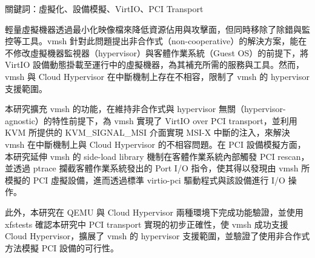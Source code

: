 \begin{ZhAbstract}
    \begin{ZhAbstractItems}
        \noindent \text 關鍵詞：虛擬化、設備模擬、VirtIO、PCI Transport

    \end{ZhAbstractItems}

    \begin{ZhAbstractDescription}
        輕量虛擬機器透過最小化映像檔來降低資源佔用與攻擊面，但同時移除了除錯與監控等工具。vmsh 針對此問題提出非合作式（non-cooperative）的解決方案，能在不修改虛擬機器監視器（hypervisor）與客體作業系統（Guest OS）的前提下，將 VirtIO 設備動態掛載至運行中的虛擬機器，為其補充所需的服務與工具。然而，vmsh 與 Cloud Hypervisor 在中斷機制上存在不相容，限制了 vmsh 的 hypervisor 支援範圍。

        本研究擴充 vmsh 的功能，在維持非合作式與 hypervisor 無關（hypervisor-agnostic）的特性前提下，為 vmsh 實現了 VirtIO over PCI transport，並利用 KVM 所提供的 KVM\_SIGNAL\_MSI 介面實現 MSI-X 中斷的注入，來解決 vmsh 在中斷機制上與 Cloud Hypervisor 的不相容問題。在 PCI 設備模擬方面，本研究延伸 vmsh 的 side-load library 機制在客體作業系統內部觸發 PCI rescan，並透過 ptrace 攔截客體作業系統發出的 Port I/O 指令，使其得以發現由 vmsh 所模擬的 PCI 虛擬設備，進而透過標準 virtio-pci 驅動程式與該設備進行 I/O 操作。

        此外，本研究在 QEMU 與 Cloud Hypervisor 兩種環境下完成功能驗證，並使用 xfstests 確認本研究中 PCI transport 實現的初步正確性，使 vmsh 成功支援 Cloud Hypervisor，擴展了 vmsh 的 hypervisor 支援範圍，並驗證了使用非合作式方法模擬 PCI 設備的可行性。
    \end{ZhAbstractDescription}

\end{ZhAbstract}
